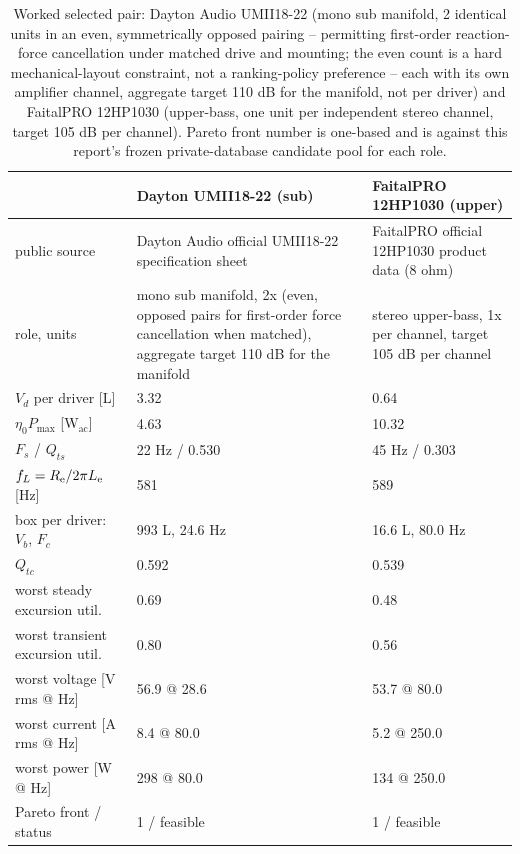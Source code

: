 \begin{table}[htbp]
\centering
\caption{Worked selected pair: Dayton Audio UMII18-22 (mono sub manifold, 2 identical units in an even, symmetrically opposed pairing -- permitting first-order reaction-force cancellation under matched drive and mounting; the even count is a hard mechanical-layout constraint, not a ranking-policy preference -- each with its own amplifier channel, aggregate target 110 dB for the manifold, not per driver) and FaitalPRO 12HP1030 (upper-bass, one unit per independent stereo channel, target 105 dB per channel). Pareto front number is one-based and is against this report's frozen private-database candidate pool for each role.}
\label{tab:worked-pair}
\small
\begin{tabular}{p{4.0cm}p{5.1cm}p{5.1cm}}
\toprule
 & Dayton UMII18-22 (sub) & FaitalPRO 12HP1030 (upper)\\
\midrule
public source & Dayton Audio official UMII18-22 specification sheet & FaitalPRO official 12HP1030 product data (8 ohm)\\
role, units & mono sub manifold, 2x (even, opposed pairs for first-order force cancellation when matched), aggregate target 110 dB for the manifold & stereo upper-bass, 1x per channel, target 105 dB per channel\\
$V_d$ per driver [L] & 3.32 & 0.64\\
$\eta_0 P_{\max}$ [W$_{\mathrm{ac}}$] & 4.63 & 10.32\\
$F_s$ / $Q_{ts}$ & 22 Hz / 0.530 & 45 Hz / 0.303\\
$f_L=R_{\mathrm{e}}/2\pi L_{\mathrm{e}}$ [Hz] & 581 & 589\\
box per driver: $V_b$, $F_c$ & 993 L, 24.6 Hz & 16.6 L, 80.0 Hz\\
$Q_{tc}$ & 0.592 & 0.539\\
worst steady excursion util. & 0.69 & 0.48\\
worst transient excursion util. & 0.80 & 0.56\\
worst voltage [V rms @ Hz] & 56.9 @ 28.6 & 53.7 @ 80.0\\
worst current [A rms @ Hz] & 8.4 @ 80.0 & 5.2 @ 250.0\\
worst power [W @ Hz] & 298 @ 80.0 & 134 @ 250.0\\
Pareto front / status & 1 / feasible & 1 / feasible\\
\bottomrule
\end{tabular}
\end{table}
